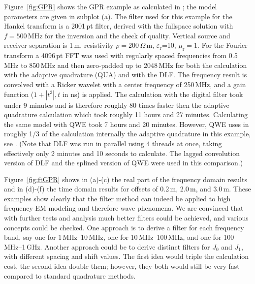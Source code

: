 \documentclass[paper,twocolumn,twoside]{geophysics}
\newcommand{\mr}[1]{\mathrm{#1}}
\begin{document}
Figure~\ref{fig:GPR} shows the GPR example as calculated in
\cite{GEO.15.Hunziker, GEO.17.Werthmuller}; the model parameters are given in
subplot (a). The filter used for this example for the Hankel transform is a
2001\,pt filter, derived with the fullspace solution with $f=500\,$MHz for the
inversion and the check of quality. Vertical source and receiver separation is
1\,m, resistivity $\rho=200\,\Omega\,$m, $\varepsilon_\mr{r}$=10,
$\mu_\mr{r}=1$. For the Fourier transform a 4096\,pt FFT was used with
regularly spaced frequencies from 0.5\,MHz to 850\,MHz and then zero-padded up
to 2048\,MHz for both the calculation with the adaptive quadrature (QUA) and
with the DLF. The frequency result is convolved with a Ricker wavelet with a
center frequency of 250\,MHz, and a gain function ($1 + |t^3|, t$ in ns) is
applied. The calculation with the digital filter took under 9 minutes and is
therefore roughly 80 times faster then the adaptive quadrature calculation
which took roughly 11 hours and 27 minutes. Calculating the same model with QWE
took 7 hours and 20 minutes. However, QWE uses in roughly 1/3 of the
calculation internally the adaptive quadrature in this example, see
\cite{GEO.17.Werthmuller}. (Note that DLF was run in parallel using 4 threads
at once, taking effectively only 2 minutes and 10 seconds to calculate.
The lagged convolution version of DLF and the splined version of QWE were used
in this comparison.)
%
%

Figure~\ref{fig:ftGPR} shows in (a)-(c) the real part of the frequency domain
results and in (d)-(f) the time domain results for offsets of 0.2\,m, 2.0\,m,
and 3.0\,m.
%
%
These examples show clearly that the filter method can indeed be applied to
high frequency EM modeling and therefore wave phenomena. We are convinced that
with further tests and analysis much better filters could be achieved, and
various concepts could be checked. One approach is to derive a filter for each
frequency band, say one for 1\,MHz--10\,MHz, one for 10\,MHz--100\,MHz, and one
for 100\,MHz--1\,GHz. Another approach could be to derive distinct filters for
$J_0$ and $J_1$, with different spacing and shift values. The first idea would
triple the calculation cost, the second idea double them; however, they both
would still be very fast compared to standard quadrature methods.
\end{document}
